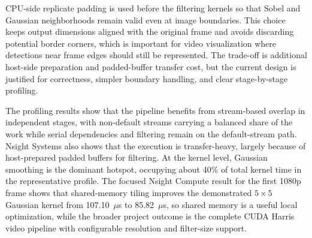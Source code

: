 \documentclass[conference]{IEEEtran}
\begin{document}
CPU-side replicate padding is used before the filtering kernels so that Sobel and Gaussian neighborhoods remain valid even at image boundaries. This choice keeps output dimensions aligned with the original frame and avoids discarding potential border corners, which is important for video visualization where detections near frame edges should still be represented. The trade-off is additional host-side preparation and padded-buffer transfer cost, but the current design is justified for correctness, simpler boundary handling, and clear stage-by-stage profiling.

The profiling results show that the pipeline benefits from stream-based overlap in independent stages, with non-default streams carrying a balanced share of the work while serial dependencies and filtering remain on the default-stream path. Nsight Systems also shows that the execution is transfer-heavy, largely because of host-prepared padded buffers for filtering. At the kernel level, Gaussian smoothing is the dominant hotspot, occupying about 40\% of total kernel time in the representative profile. The focused Nsight Compute result for the first 1080p frame shows that shared-memory tiling improves the demonstrated $5\times5$ Gaussian kernel from 107.10~$\mu$s to 85.82~$\mu$s, so shared memory is a useful local optimization, while the broader project outcome is the complete CUDA Harris video pipeline with configurable resolution and filter-size support.



\end{document}
